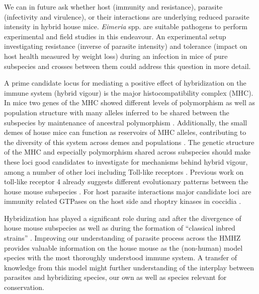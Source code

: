We can in future ask whether host (immunity and resistance), parasite (infectivity and virulence), or their interactions are underlying reduced parasite intensity in hybrid house mice. \textit{Eimeria} spp. are suitable pathogens to perform experimental and field studies in this endeavour. An experimental setup investigating resistance (inverse of parasite intensity) and tolerance (impact on host health measured by weight loss) during an infection in mice of pure subspecies and crosses between them could address this question in more detail.
\par A prime candidate locus for mediating a positive effect of hybridization on the immune system (hybrid vigour) is the major histocompatibility complex (MHC). In mice two genes of the MHC showed different levels of polymorphism as well as population structure with many alleles inferred to be shared between the subspecies by maintenance of ancestral polymorphism \citep{cizkova_genetic_2011}. Additionally, the small demes of house mice can function as reservoirs of MHC alleles, contributing to the diversity of this system across demes and populations \citep{linnenbrink_meta-populational_2018}. The genetic structure of the MHC and especially polymorphism shared across subspecies should make these loci good candidates to investigate for mechanisms behind hybrid vigour, among a number of other loci including Toll-like receptors \citep{skevaki_single_2015}. Previous work on toll-like receptor 4 already suggests different evolutionary patterns between the house mouse subspecies \citep{fornuskova_contrasting_2014}. For host parasite interactions major candidate loci are immunity related GTPases on the host side and rhoptry kinases in coccidia \citep{lilue_reciprocal_2013}. 
\par Hybridization has played a significant role during and after the divergence of house mouse subspecies as well as during the formation of “classical inbred strains” \citep{yang_subspecific_2011}. Improving our understanding of parasite process across the HMHZ provides valuable information on the house mouse as the (non-human) model species with the most thoroughly understood immune system. A transfer of knowledge from this model might further understanding of the interplay between parasites and hybridizing species, our own as well as species relevant for conservation.
